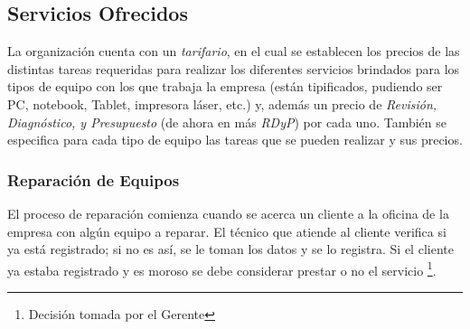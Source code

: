 \documentclass[12pt]{extarticle}
\begin{document}
\begin{spacing}{1.2}





    \pagebreak


    \subsection{Servicios Ofrecidos}
    La organización cuenta con un \textit{tarifario}, en el cual se establecen los precios de las distintas tareas requeridas para realizar los diferentes servicios brindados para los tipos de equipo con los que trabaja la empresa (están tipificados, pudiendo ser PC, notebook, Tablet, impresora láser, etc.) y, además un precio de \textit{Revisión, Diagnóstico, y Presupuesto} (de ahora en más \textit{RDyP}) por cada uno. También se especifica para cada tipo de equipo las tareas que se pueden realizar y sus precios.

    \subsubsection{Reparación de Equipos}
    El proceso de reparación comienza cuando se acerca un cliente a la oficina de la empresa con algún equipo a reparar. El técnico que atiende al cliente verifica si ya está registrado; si no es así, se le toman los datos y se lo registra. Si el cliente ya estaba registrado y es moroso se debe considerar prestar o no el servicio \footnote{Decisión tomada por el Gerente}.
    

\end{spacing}
\end{document}
